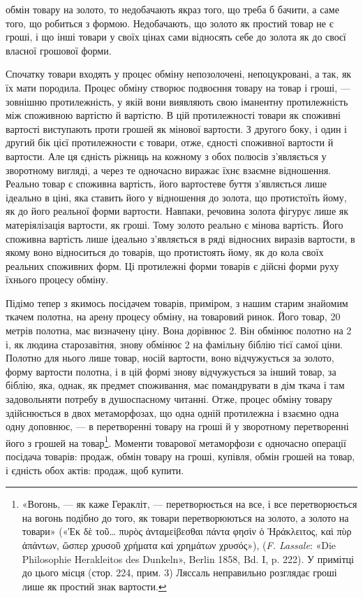 \parcont{}  %
обмін товару на золото, то недобачають якраз того, що треба б
бачити, а саме того, що робиться з формою. Недобачають, що золото
як простий товар не є гроші, і що інші товари у своїх цінах
сами відносять себе до золота як до своєї власної грошової
форми.

Спочатку товари входять у процес обміну непозолочені, непоцукровані,
а так, як їх мати породила. Процес обміну створює
подвоєння товару на товар і гроші, — зовнішню протилежність,
у якій вони виявляють свою іманентну протилежність між споживною
вартістю й вартістю. В цій протилежності товари як
споживні вартості виступають проти грошей як мінової вартости.
З другого боку, і один і другий бік цієї протилежности
є товари, отже, єдності споживної вартости й вартости. Але ця
єдність ріжниць на кожному з обох полюсів з’являється у зворотному
вигляді, а через те одночасно виражає їхнє взаємне відношення.
Реально товар є споживна вартість, його вартостеве
буття з’являється лише ідеально в ціні, яка ставить його у відношення
до золота, що протистоїть йому, як до його реальної
форми вартости. Навпаки, речовина золота фігурує лише як матеріялізація
вартости, як гроші. Тому золото реально є мінова
вартість. Його споживна вартість лише ідеально з’являється в
ряді відносних виразів вартости, в якому воно відноситься до
товарів, що протистоять йому, як до кола своїх реальних споживних
форм. Ці протилежні форми товарів є дійсні форми руху
їхнього процесу обміну.

Підімо тепер з якимось посідачем товарів, приміром, з нашим
старим знайомим ткачем полотна, на арену процесу обміну, на
товаровий ринок. Його товар, 20 метрів полотна, має визначену
ціну. Вона дорівнює 2. Він обмінює полотно
на 2 і, як людина старозавітня, знову обмінює
2 на фамільну біблію тієї самої ціни. Полотно
для нього лише товар, носій вартости, воно відчужується за
золото, форму вартости полотна, і в цій формі знову відчужується
за інший товар, за біблію, яка, однак, як предмет споживання,
має помандрувати в дім ткача і там задовольняти потребу
в душоспасному читанні. Отже, процес обміну товару здійснюється
в двох метаморфозах, що одна одній протилежна і взаємно
одна одну доповнює, — в перетворенні товару на гроші й у зворотному
перетворенні його з грошей на товар\footnote{
«Вогонь, — як каже Геракліт, — перетворюється на все, і все
перетворюється на вогонь подібно до того, як товари перетворюються на
золото, а золото на товари» («\textgreek{Ἐκ δὲ τοῦ\dots{} πυρὸς ἀνταμείβεσθαι πάντα φησὶν ὁ Ἡράκλειτος, καὶ πὺρ
ἁπάντων, ὥσπερ χρυσοῦ χρήματα καὶ χρημάτων χρυσός}»), (\emph{F. Lassale}:
«Die Philosophie Herakleitos des Dunkeln», Berlin 1858, Bd. I, p. 222).
У примітці до цього місця (стор. 224, прим. 3) Ляссаль неправильно розглядає
гроші лише як простий знак вартости.
}. Моменти товарової
метаморфози є одночасно операції посідача товарів: продаж,
обмін товару на гроші, купівля, обмін грошей на товар,
і єдність обох актів: продаж, щоб купити.
